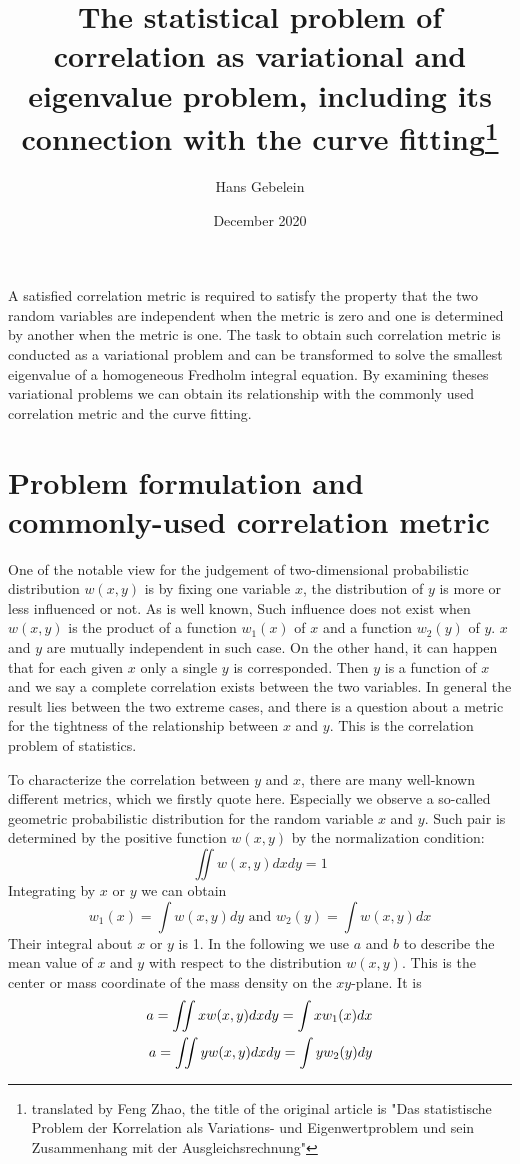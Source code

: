 \documentclass{article}
\title{The statistical problem of correlation as variational and eigenvalue problem, including its connection with the curve fitting\footnote{translated by Feng Zhao, the title of the original article is "Das statistische Problem der Korrelation als Variations- und Eigenwertproblem und sein Zusammenhang mit der Ausgleichsrechnung"}}
\date{December 2020}
\author{Hans Gebelein}
\begin{document}
\maketitle
\begin{centering}
A satisfied correlation metric is required to satisfy
the property that the two random variables are independent when the metric is zero and one is
determined by another when the metric is one.
The task to obtain such correlation metric is conducted
as a variational problem and can be transformed to solve
the smallest eigenvalue of a homogeneous Fredholm integral equation. By examining theses variational
problems we can obtain its relationship with the commonly used correlation metric and the curve fitting.
\end{centering}

\section{Problem formulation and commonly-used correlation metric}
One of the notable view for the judgement of two-dimensional probabilistic distribution $w(x,y)$ is by fixing one variable $x$, the distribution of $y$ is more or less influenced or not. As is well known,
Such influence does not exist when $w(x,y)$
is the product of a function $w_1(x)$ of $x$ and
a function $w_2(y)$ of $y$. $x$ and $y$
are mutually independent in such case. On the
other hand, it can happen that for each given $x$
only a single $y$ is corresponded. Then $y$
is a function of $x$ and we say a complete correlation
exists between the two variables. In general the result lies between the two extreme cases, and there is a question about a metric for the tightness of the relationship
between $x$ and $y$. This is the correlation problem of statistics.

To characterize the correlation between $y$ and $x$,
there are many well-known different metrics, which we firstly quote here. Especially we observe a so-called
geometric probabilistic distribution for the random variable $x$ and $y$. Such pair is determined by the
positive function $w(x,y)$ by the normalization condition:
\begin{equation}
    \iint w(x,y) dx dy = 1
\end{equation}
Integrating by $x$ or $y$ we can obtain
\begin{equation}
    w_1(x) = \int w(x,y)dy \textrm{ and }
    w_2(y) = \int w(x,y)dx
\end{equation}
Their integral about $x$ or $y$ is 1. In the following we use $a$
and $b$ to describe the mean value of $x$ and $y$
with respect to the distribution $w(x,y)$.
This is the center or mass coordinate of the mass
density on the $xy$-plane. It is
\begin{align}
    a = \iint x w(x,y) dx dy = \int x w_1(x)dx \notag \\
    a = \iint y w(x,y) dx dy = \int y w_2(y)dy 
\end{align}
\end{document}
